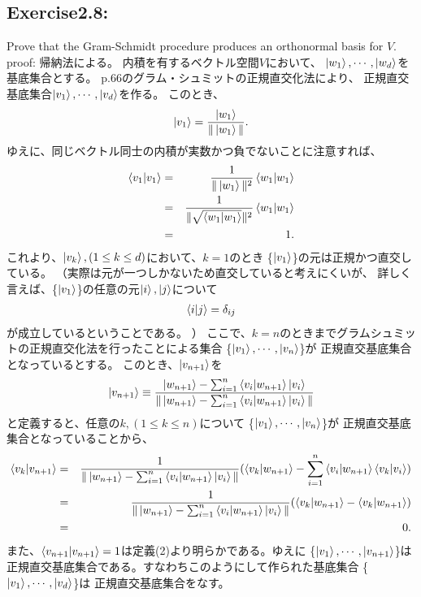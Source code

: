 \setcounter{equation}{0}
\begin{flushleft}
\section{\Large Exercise2.8:} Prove that the Gram-Schmidt procedure produces an orthonormal basis for $V$.
\newline
{\large proof:}
帰納法による。
内積を有するベクトル空間$V$において、
$\ket{w_1}, \cdots, \ket{w_d}$を基底集合とする。
p.66のグラム・シュミットの正規直交化法により、
正規直交基底集合$\ket{v_1}, \cdots, \ket{v_d}$を作る。
このとき、
\begin{eqnarray}
\ket{v_1} = \frac{\ket{w_1}}{\|\ket{w_1}\|}.
\end{eqnarray}
ゆえに、同じベクトル同士の内積が実数かつ負でないことに注意すれば、
\begin{eqnarray*}
\braket{v_1|v_1} &=& \frac{1}{\|\ket{w_1}\|^2}\braket{w_1|w_1}\\
&=& \frac{1}{\|\sqrt{\braket{w_1|w_1}}\|^2}\braket{w_1|w_1}\\
&=& 1.
\end{eqnarray*}
これより、$\ket{v_k},(1\leq k\leq d)$において、$k = 1$のとき 
\{$\ket{v_1}$\}の元は正規かつ直交している。
\color{blue}
\newline
（実際は元が一つしかないため直交していると考えにくいが、
詳しく言えば、\{$\ket{v_1}$\}の任意の元$\ket{i}, \ket{j}$について
\begin{eqnarray*}
\braket{i|j} = \delta_{ij}
\end{eqnarray*}
が成立しているということである。
）
\color{black}
\newline
ここで、$k = n$のときまでグラムシュミットの正規直交化法を行ったことによる集合
\{$\ket{v_1}, \cdots, \ket{v_{n}}$\}が
正規直交基底集合となっているとする。
このとき、$\ket{v_{n+1}}$を
\begin{eqnarray}
\ket{v_{n+1}} \equiv \frac{\ket{w_{n+1}} - 
\sum_{i=1}^n\braket{v_i|w_{n+1}}\ket{v_i}}
{\|\ket{w_{n+1}} - 
\sum_{i=1}^n\braket{v_i|w_{n+1}}\ket{v_i}\|}
\end{eqnarray}
と定義すると、任意の$k, (1\leq k\leq n)$について
\{$\ket{v_1}, \cdots, \ket{v_{n}}$\}が
正規直交基底集合となっていることから、
\begin{eqnarray*}
\braket{v_k|v_{n+1}} &=& \frac{1}{\|\ket{w_{n+1}} - 
\sum_{i=1}^n\braket{v_i|w_{n+1}}\ket{v_i}\|}
(\braket{v_k|w_{n+1}} - 
\sum_{i=1}^n\braket{v_i|w_{n+1}}\braket{v_k|v_i})\\
&=& \frac{1}{\|\ket{w_{n+1}} - 
\sum_{i=1}^n\braket{v_i|w_{n+1}}\ket{v_i}\|}
(\braket{v_k|w_{n+1}} - \braket{v_k|w_{n+1}})\\
&=& 0.
\end{eqnarray*}
また、$\braket{v_{n+1}|v_{n+1}} = 1$は定義(2)より明らかである。ゆえに
\{$\ket{v_1}, \cdots, \ket{v_{n+1}}$\}は
正規直交基底集合である。すなわちこのようにして作られた基底集合
\{$\ket{v_1}, \cdots, \ket{v_{d}}$\}は
正規直交基底集合をなす。
\end{flushleft}
